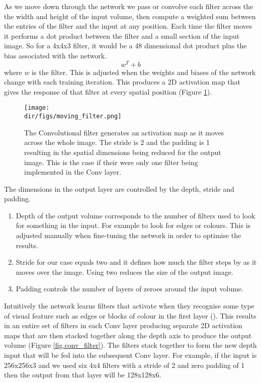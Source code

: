 As we move down through the network we pass or convolve each filter across the the width and height of the input volume, then compute a weighted sum between the entries of the filter and the input at any position. Each time the filter moves it performs a dot product between the filter and a small section of the input image. So for a 4x4x3 filter, it would be a 48 dimensional dot product plus the bias associated with the network. 
\[ w^T + b \] where $w$ is the filter.
This is adjusted when the weights and biases of the network change with each training iteration. This produces a 2D activation map that gives the response of that filter at every spatial position (Figure \ref{fig.moving_filter}). 
 
\begin{figure}[htbp]
    \centering
    \texttt{[image: \\dir/figs/moving\_filter.png]}
    \caption[Example of one Convolutional filter]{The Convolutional filter generates an activation map as it moves across the whole image. The stride is 2 and the padding is 1 resulting in the spatial dimensions being reduced for the output image. This is the case if their were only one filter being implemented in the Conv layer.}
    \label{fig.moving_filter}
\end{figure}
The dimensions in the output layer are controlled by the depth, stride and padding. 
\begin{enumerate}
    \item Depth of the output volume corresponds to the number of filters used to look for something in the input. For example to look for edges or colours. This is adjusted manually when fine-tuning the network in order to optimise the results.
    \item Stride for our case equals two and it defines how much the filter steps by as it moves over the image. Using two reduces the size of the output image.
    \item Padding controls the number of layers of zeroes around the input volume. 
\end{enumerate}
Intuitively the network learns filters that activate when they recognise some type of visual feature such as edges or blocks of colour in the first layer (\cite{karpathy_cnn1}). This results in an entire set of filters in each Conv layer producing separate 2D activation maps that are then stacked together along the depth axis to produce the output volume (Figure \ref{fig.conv_filter}). The filters stack together to form the new depth input that will be fed into the subsequent Conv layer. For example, if the input is 256x256x3 and we used six 4x4 filters with a stride of 2 and zero padding of 1 then the output from that layer will be 128x128x6. 

